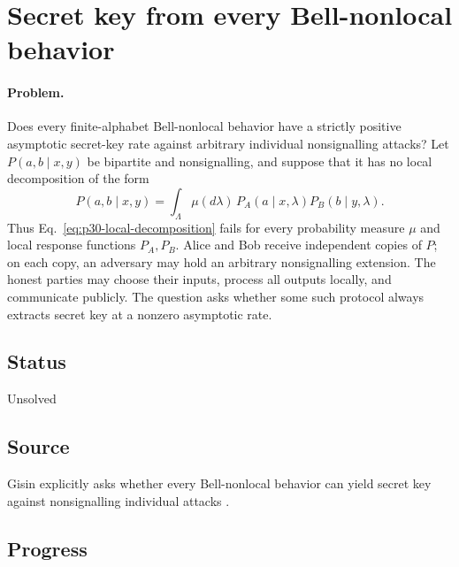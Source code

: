 \section{Secret key from every Bell-nonlocal behavior}
\label{sec:op_299c3becfd760123}

\paragraph{Problem.}
Does every finite-alphabet Bell-nonlocal behavior have a strictly positive
asymptotic secret-key rate against arbitrary individual nonsignalling attacks?
Let $P(a,b\mid x,y)$ be bipartite and nonsignalling, and suppose that it has no
local decomposition of the form
\begin{equation}
  P(a,b\mid x,y)
  =\int_\Lambda \mu(d\lambda)\,
    P_A(a\mid x,\lambda)P_B(b\mid y,\lambda).
  \label{eq:p30-local-decomposition}
\end{equation}
Thus Eq.~\eqref{eq:p30-local-decomposition} fails for every probability
measure $\mu$ and local response functions $P_A,P_B$.  Alice and Bob receive
independent copies of $P$; on each copy, an adversary may hold an arbitrary
nonsignalling extension.  The honest parties may choose their inputs, process
all outputs locally, and communicate publicly.  The question asks whether
some such protocol always extracts secret key at a nonzero asymptotic rate.

\subsection*{Status}

Unsolved

\subsection*{Source}

Gisin explicitly asks whether every Bell-nonlocal behavior can yield secret
key against nonsignalling individual attacks
.

\subsection*{Progress}


